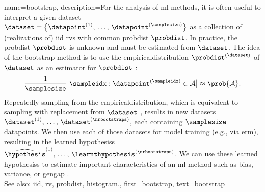 {name={bootstrap},
	description={For the analysis of \gls{ml} methods, it is often 
	    	useful to interpret a given \gls{dataset} $\dataset = \big\{ \datapoint^{(1)}, \,\ldots, \,\datapoint^{(\samplesize)}\big\}$ 
		as a collection of (\glspl{realization} of) \gls{iid} \glspl{rv} with 
		common \gls{probdist} $\probdist$. In practice, the \gls{probdist} $\probdist$ 
		is unknown and must be estimated from $\dataset$. The idea of the bootstrap 
		method is to use the \gls{empiricaldistribution} $\probdist^{(\dataset)}$ 
		of $\dataset$ as an \gls{estimator} for $\probdist$ \cite{hastie01statisticallearning}:
		$$ \frac{1}{\samplesize} \big| \sampleidx: \datapoint^{(\sampleidx)} \in \mathcal{A} \big| \approx \prob{\mathcal{A}}.$$
		Repeatedly sampling from the \gls{empiricaldistribution}, which is equivalent 
		to sampling with replacement from $\dataset$ \cite{BoostrapBook}, 
		results in new \glspl{dataset} $\dataset^{(1)}, \,\ldots, \,\dataset^{(\nrbootstraps)}$, each containing 
		$\samplesize$ \glspl{datapoint}. We then use each of 
		those \glspl{dataset} for \gls{model} \gls{training} (e.g., via \gls{erm}), 
		resulting in the learned \glspl{hypothesis}
		$\widehat{\hypothesis}^{(1)}, \,\ldots, \,\learnthypothesis^{(\nrbootstraps)}.$ 
        		We can use these learned \glspl{hypothesis} to estimate important characteristics 
		of an \gls{ml} method such as \gls{bias}, \gls{variance}, or \gls{gengap} \cite{hastie01statisticallearning}.
		\\
		See also: \gls{iid}, \gls{rv}, \gls{probdist}, \gls{histogram}.},
	first={bootstrap},
	text={bootstrap}  
}

